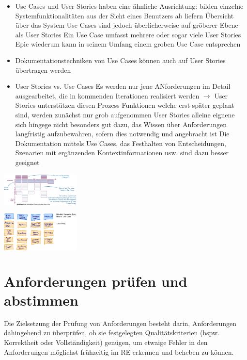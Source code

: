 \documentclass{report}
\newenvironment{Figure}
	{\par\medskip\noindent\minipage{\linewidth}}
	{\endminipage\par\medskip}
\theoremstyle{definition}
\theoremstyle{example}
\begin{document}
\begin{itemize}
   \item Use Cases und User Stories haben eine ähnliche Ausrichtung:
   \subitem bilden einzelne Systemfunktionalitäten aus der Sicht eines Benutzers ab
   \subitem liefern Übersicht über das System
   \subitem Use Cases sind jedoch überlicherweise auf gröberer Ebene als User Stories
   \subitem Ein Use Case umfasst mehrere oder sogar viele User Stories
   \subitem Epic wiederum kann in seinem Umfang einem groben Use Case entsprechen
   \item Dokumentationstechniken von Use Cases können auch auf User Stories übertragen werden
   \item User Stories vs. Use Cases
   \subitem Es werden nur jene ANforderungen im Detail ausgearbeitet, die in kommenden Iterationen realisiert werden $\rightarrow$ User Stories unterstützen diesen Prozess
   \subitem Funktionen welche erst später geplant sind, werden zunächst nur grob aufgenommen
   \subitem User Stories alleine eignene sich hingege nicht besonders gut dazu, das Wissen über Anforderungen langfristig aufzubewahren, sofern dies notwendig und angebracht ist
   \subitem Die Dokumentation mittels Use Cases, das Festhalten von Entscheidungen, Szenarien mit ergänzenden Kontextinformationen usw. sind dazu besser geeignet 
\end{itemize}

\begin{Figure}
   \centering
    \includegraphics[width=150px]{img/StoryMap.png}
        \label{fig:Beispiel einer StoryMap}
\end{Figure}

\begin{Figure}
   \centering
    \includegraphics[width=150px]{img/StoryMappII.png}
        \label{fig:Beispiel einer weiteren StoryMap}
\end{Figure}

\section{Anforderungen prüfen und abstimmen}
Die Zielsetzung der Prüfung von Anforderungen besteht darin, Anforderungen dahingehend zu überprüfen, ob sie festgelegten Qualitätskriterien (bspw. Korrektheit oder Vollständigkeit) genügen, um etwaige Fehler in den Anforderungen möglichst frühzeitig im RE erkennen und beheben zu können.
\end{document}

